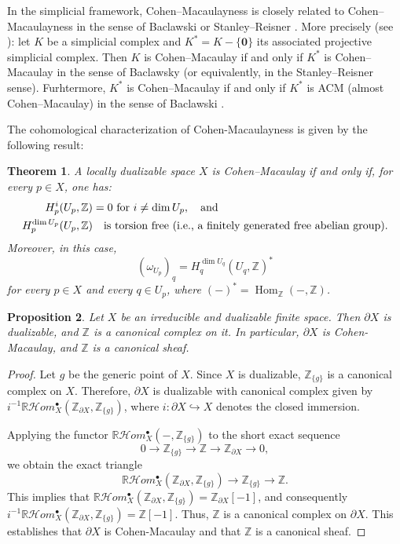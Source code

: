 \documentclass[amssymb,amscd,11pt,20pt]{amsart}
\newcommand{\ZZ}{{\mathbb Z}}
\newcommand{\RR}{\mathbb R}
\newcommand{\0}{\mathbf 0}
\DeclareMathOperator{\Hom}{{Hom}}
\newcommand{\pun}{{\scriptscriptstyle \bullet}}
\newcommand{\HHom}{\mathcal{H}om}
\theoremstyle{plain}
\newtheorem{thm}{Theorem}[section]
\newtheorem{prop}[thm]{Proposition}
\numberwithin{equation}{thm}
\begin{document}
In the simplicial framework, Cohen--Macaulayness is closely related to Cohen--Macaulayness in the sense of Baclawski \cite{B} or Stanley--Reisner \cite{BH}. More precisely (see \cite{ST2}): let $K$ be a simplicial complex and $K^*=K-\{\0\}$ its associated projective simplicial complex. Then $K$ is Cohen--Macaulay if and only if $K^*$ is Cohen--Macaulay in the sense of Baclawsky (or equivalently,  in the Stanley--Reisner sense). Furhtermore, $K^*$ is Cohen--Macaulay if and only if $K^*$ is ACM (almost Cohen--Macaulay) in the sense of Baclawski \cite{B}.


The cohomological characterization of   Cohen-Macaulayness is given by the following result:  

\begin{thm}\cite[Thm. 5.18 and Cor. 5.20]{ST2}\label{CM} A locally dualizable space $X$ is Cohen--Macaulay if and only if, for every $p\in X$, one has:
\[\aligned  H^i_p(U_p,\ZZ) &=0 \text{ for }i\neq\dim U_p,\quad  \text{and}\\   H^{\dim U_p}_p(U_p,\ZZ)&\quad  \text{is torsion free (i.e., a finitely generated free abelian group).}\endaligned\] Moreover, in this case, 
\[(\omega_{U_p})_q= H^{\dim U_q}_q(U_q,\ZZ)^* \] for every $p\in X$ and every $q\in U_p$, where $(-)^*=\Hom_\ZZ(-,\ZZ)$.
\end{thm}

\begin{prop}\label{partial X} Let $X$ be an irreducible and dualizable finite space. Then $\partial X$ is dualizable, and $\ZZ$ is a canonical complex on it. In particular, $\partial X$ is Cohen-Macaulay, and $\ZZ$ is a canonical sheaf. 
\end{prop}

\begin{proof}  Let $g$ be the generic point of $X$. Since  $X$ is dualizable,   $\ZZ_{\{g\}}$ is a canonical complex on $X$. Therefore, $\partial X$ is dualizable with canonical complex given by $i^{-1}\RR\HHom^\pun_X(\ZZ_{\partial X},\ZZ_{\{g\}})$, where $i\colon \partial X\hookrightarrow X$ denotes the closed immersion.  %

Applying the functor  $\RR\HHom^\pun_X(-,\ZZ_{\{g\}})$ to the short exact sequence
\[ 0\to \ZZ_{\{g\}}\to\ZZ\to \ZZ_{\partial X}\to 0,\] we obtain the exact triangle
\[ \RR\HHom^\pun_X(\ZZ_{\partial X},\ZZ_{\{g\}})\to \ZZ_{\{g\}} \to \ZZ.\] This implies that $\RR\HHom^\pun_X(\ZZ_{\partial X},\ZZ_{\{g\}})=\ZZ_{\partial X}[-1]$, and consequently $i^{-1}\RR\HHom^\pun_X(\ZZ_{\partial X},\ZZ_{\{g\}})=\ZZ[-1]$. Thus,  $\ZZ$ is a canonical complex on $\partial X$. This establishes that $\partial X$ is Cohen-Macaulay and that $\ZZ$ is a canonical sheaf.
\end{proof}
\end{document}
